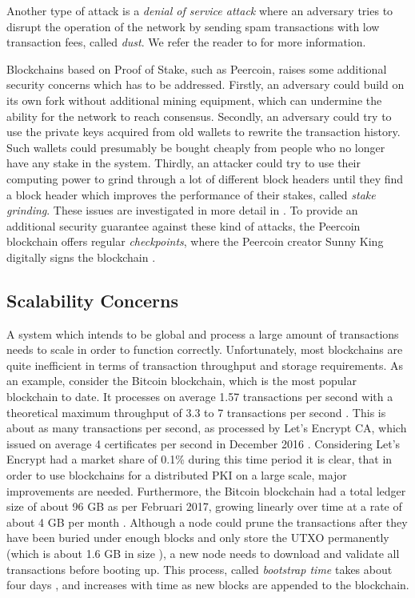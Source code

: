 \documentclass{style/kththesis}
\begin{document}
Another type of attack is a \emph{denial of service attack} where an adversary tries to disrupt the operation of the network by sending spam transactions with low transaction fees, called \emph{dust}. We refer the reader to \cite{Baqer16} for more information.

Blockchains based on Proof of Stake, such as Peercoin, raises some additional security concerns which has to be addressed. Firstly, an adversary could build on its own fork without additional mining equipment, which can undermine the ability for the network to reach consensus. Secondly, an adversary could try to use the private keys acquired from old wallets to rewrite the transaction history. Such wallets could presumably be bought cheaply from people who no longer have any stake in the system. Thirdly, an attacker could try to use their computing power to grind through a lot of different block headers until they find a block header which improves the performance of their stakes, called \emph{stake grinding}. These issues are investigated in more detail in \cite{Davarpanah15}. To provide an additional security guarantee against these kind of attacks, the Peercoin blockchain offers regular \emph{checkpoints}, where the Peercoin creator Sunny King digitally signs the blockchain \cite{King12}.

\subsection{Scalability Concerns}
\label{scalability-concerns}
A system which intends to be global and process a large amount of transactions needs to scale in order to function correctly. Unfortunately, most blockchains are quite inefficient in terms of transaction throughput and storage requirements. As an example, consider the Bitcoin blockchain, which is the most popular blockchain to date. It processes on average 1.57 transactions per second with a theoretical maximum throughput of 3.3 to 7 transactions per second \cite{Croman16}. This is about as many transactions per second, as processed by Let's Encrypt CA, which issued on average 4 certificates per second in December 2016 \cite{LetsEncrypt17}. Considering Let's Encrypt had a market share of 0.1\% during this time period \cite{W3Techs17} it is clear, that in order to use blockchains for a distributed PKI on a large scale, major improvements are needed. Furthermore, the Bitcoin blockchain had a total ledger size of about 96 GB as per Februari 2017, growing linearly over time at a rate of about 4 GB per month \cite{Blockchain17}. Although a node could prune the transactions after they have been buried under enough blocks and only store the UTXO permanently (which is about 1.6 GB in size \cite{Statoshi17}), a new node needs to download and validate all transactions before booting up. This process, called \emph{bootstrap time} takes about four days \cite{Croman16}, and increases with time as new blocks are appended to the blockchain.
\end{document}
